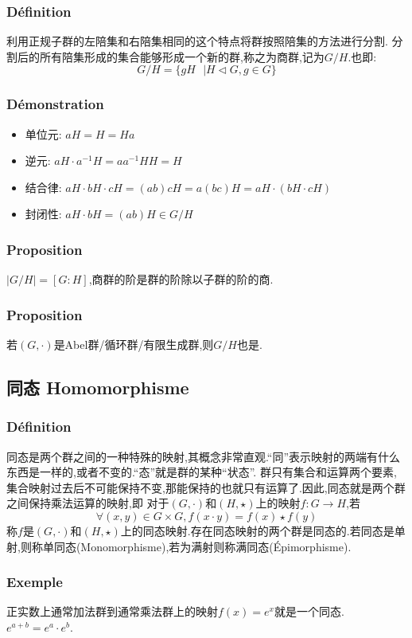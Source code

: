 \documentclass[12pt, a4paper, oneside]{ctexbook}
\begin{document}
  \subsubsection{Définition}
  利用正规子群的左陪集和右陪集相同的这个特点将群按照陪集的方法进行分割.
  分割后的所有陪集形成的集合能够形成一个新的群,称之为商群,记为$G/H$.也即:
  $$
  G/H=\{gH\text{ }|H\lhd G,g\in G \}
  $$
  \subsubsection{Démonstration}
  \begin{itemize}
    \item 单位元: $aH=H=Ha$
    \item 逆元: $aH\cdot a^{-1}H=aa^{-1}HH=H$
    \item 结合律: $aH\cdot bH\cdot cH=(ab)cH=a(bc)H=aH\cdot(bH\cdot cH) $
    \item 封闭性: $aH\cdot bH=(ab)H\in G/H $
  \end{itemize}
  \subsubsection{Proposition}
  $|G/H|=[G:H]$,商群的阶是群的阶除以子群的阶的商.
  \subsubsection{Proposition}
  若$(G,\cdot)$是Abel群/循环群/有限生成群,则$G/H$也是.

  \subsection{同态 Homomorphisme}    \label{myref:同态}
  \subsubsection{Définition}
  同态是两个群之间的一种特殊的映射,其概念非常直观.“同”表示映射的两端有什么东西是一样的,或者不变的.“态”就是群的某种“状态”.
  群只有集合和运算两个要素,集合映射过去后不可能保持不变,那能保持的也就只有运算了.因此,同态就是两个群之间保持乘法运算的映射,即
  对于$(G,\cdot)$和$(H,\star)$上的映射$f:G\rightarrow H $,若
  $$
    \forall (x,y)\in G\times G,f(x\cdot y)=f(x)\star f(y)
  $$称$f$是$(G,\cdot)$和$(H,\star)$上的同态映射.存在同态映射的两个群是同态的.若同态是单射,则称单同态(Monomorphisme),若为满射则称满同态(Épimorphisme).
  \subsubsection{Exemple}
  正实数上通常加法群到通常乘法群上的映射$f(x)=e^x$就是一个同态.$e^{a+b}=e^a\cdot e^b$.
\end{document}
